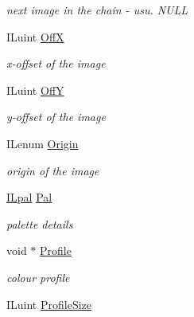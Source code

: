 \begin{DoxyCompactItemize}
\begin{DoxyCompactList}\small\item\em next image in the chain -\/ usu. N\-U\-L\-L \end{DoxyCompactList}\item 
\hypertarget{struct_i_limage_a891d8d9dbdfb70a6c65917e0c0840fe3}{I\-Luint \hyperlink{struct_i_limage_a891d8d9dbdfb70a6c65917e0c0840fe3}{Off\-X}}\label{struct_i_limage_a891d8d9dbdfb70a6c65917e0c0840fe3}

\begin{DoxyCompactList}\small\item\em x-\/offset of the image \end{DoxyCompactList}\item 
\hypertarget{struct_i_limage_a12261addd01c7aaa40f2c0976e7c688c}{I\-Luint \hyperlink{struct_i_limage_a12261addd01c7aaa40f2c0976e7c688c}{Off\-Y}}\label{struct_i_limage_a12261addd01c7aaa40f2c0976e7c688c}

\begin{DoxyCompactList}\small\item\em y-\/offset of the image \end{DoxyCompactList}\item 
\hypertarget{struct_i_limage_a6f7c49ddc9cd419e2d2af24255df902a}{I\-Lenum \hyperlink{struct_i_limage_a6f7c49ddc9cd419e2d2af24255df902a}{Origin}}\label{struct_i_limage_a6f7c49ddc9cd419e2d2af24255df902a}

\begin{DoxyCompactList}\small\item\em origin of the image \end{DoxyCompactList}\item 
\hypertarget{struct_i_limage_a689bdcea4bd95419044f5d0bd992dc3b}{\hyperlink{struct_i_lpal}{I\-Lpal} \hyperlink{struct_i_limage_a689bdcea4bd95419044f5d0bd992dc3b}{Pal}}\label{struct_i_limage_a689bdcea4bd95419044f5d0bd992dc3b}

\begin{DoxyCompactList}\small\item\em palette details \end{DoxyCompactList}\item 
\hypertarget{struct_i_limage_a600ef5a56ced202093cd70df3256bf16}{void $\ast$ \hyperlink{struct_i_limage_a600ef5a56ced202093cd70df3256bf16}{Profile}}\label{struct_i_limage_a600ef5a56ced202093cd70df3256bf16}

\begin{DoxyCompactList}\small\item\em colour profile \end{DoxyCompactList}\item 
\hypertarget{struct_i_limage_a05f25f2e1b5f2eb1beb3fd4440d852a1}{I\-Luint \hyperlink{struct_i_limage_a05f25f2e1b5f2eb1beb3fd4440d852a1}{Profile\-Size}}\label{struct_i_limage_a05f25f2e1b5f2eb1beb3fd4440d852a1}


\end{DoxyCompactItemize}
